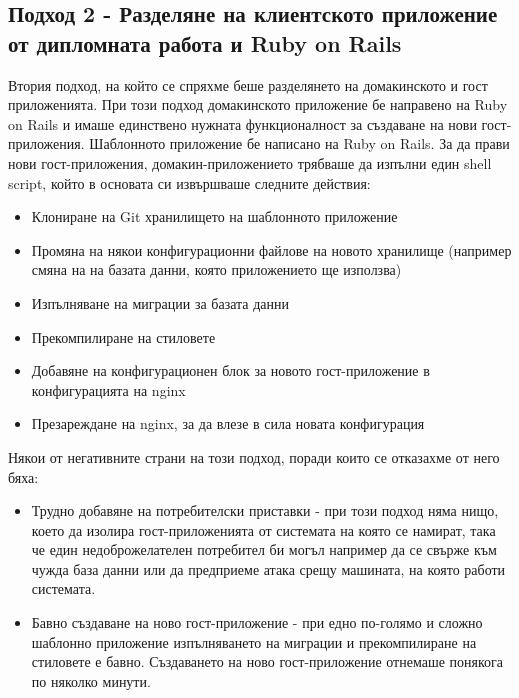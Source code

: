 \documentclass[pdftex,14pt,a4paper]{extreport}
\begin{document}
\subsection {Подход 2 - Разделяне на клиентското приложение от дипломната работа и Ruby on Rails}
Втория подход, на който се спряхме беше разделянето на домакинското и гост приложенията. При този подход домакинското приложение бе направено на Ruby on Rails и имаше единствено нужната функционалност за създаване на нови гост-приложения. Шаблонното приложение бе написано на Ruby on Rails. За да прави нови гост-приложения, домакин-приложението трябваше да изпълни един shell script, който в основата си извършваше следните действия:
\begin{itemize}
  \item Клониране на Git хранилището на шаблонното приложение
  \item Промяна на някои конфигурационни файлове на новото хранилище (например смяна на на базата данни, която приложението ще използва)
  \item Изпълняване на миграции за базата данни
  \item Прекомпилиране на стиловете
  \item Добавяне на конфигурационен блок за новото гост-приложение в конфигурацията на nginx
  \item Презареждане на nginx, за да влезе в сила новата конфигурация
\end{itemize}
Някои от негативните страни на този подход, поради които се отказахме от него бяха:
\begin{itemize}
  \item Трудно добавяне на потребителски приставки - при този подход няма нищо, което да изолира гост-приложенията от системата на която се намират, така че един недоброжелателен потребител би могъл например да се свърже към чужда база данни или да предприеме атака срещу машината, на която работи системата.
  \item Бавно създаване на ново гост-приложение - при едно по-голямо и сложно шаблонно приложение изпълняването на миграции и прекомпилиране на стиловете е бавно. Създаването на ново гост-приложение отнемаше понякога по няколко минути.
\end{itemize}
\end{document}
